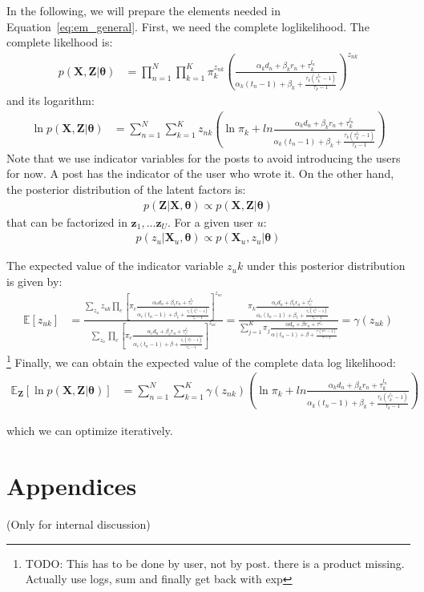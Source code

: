 \documentclass[smallextended]{svjour3}          %
\begin{document}
In the following, we will prepare the elements needed in Equation~\ref{eq:em_general}. First, we need the complete loglikelihood. The complete likelhood is:
\begin{align}
p(\mathbf{X, Z} | \boldsymbol{\theta}) &= 
\prod_{n=1}^N \prod_{k=1}^K \pi_k^{z_{nk}}
\left(
\frac{\alpha_k d_n + \beta_k r_n + \tau_k^{l_n}}{\alpha_k(t_n-1)+\beta_k + \frac{\tau_k(\tau_k^{t_n}-1)}{\tau_k-1}}
\right)^{z_{nk}}
\end{align}
and its logarithm:
\begin{align}
\ln p(\mathbf{X, Z} | \boldsymbol{\theta}) &= 
\sum_{n=1}^N \sum_{k=1}^K z_{nk}
\left(\ln \pi_k + 
ln \frac{\alpha_k d_n + \beta_k r_n + \tau_k^{l_n}}{\alpha_k(t_n-1)+\beta_k + \frac{\tau_k(\tau_k^{t_n}-1)}{\tau_k-1}}\right)
\end{align}
Note that we use indicator variables for the posts to avoid introducing the users for now. A post has the indicator of the user who wrote it. On the other hand, the posterior distribution of the latent factors is:
\begin{align*}
p(\mathbf{Z} | \mathbf{X}, \boldsymbol{\theta}) 
\propto 
p(\mathbf{X,Z} | \boldsymbol{\theta})
\end{align*}
that can be factorized in $\mathbf{z}_1,...\mathbf{z}_U$. For a given user $u$:
\begin{align*}
p(z_u | \mathbf{X}_u, \boldsymbol{\theta}) 
\propto 
p(\mathbf{X}_u, z_u | \boldsymbol{\theta})
\end{align*}

The expected value of the indicator variable $z_uk$ under this posterior distribution is given by:
\begin{align}
\mathbb{E}[z_{uk}] 
&= 
\frac{\sum_{z_u} z_{uk} \prod_c\left[\pi_c \frac{\alpha_c d_n + \beta_c r_n + \tau_c^{l_n}}{\alpha_c(t_n-1)+\beta_c + \frac{\tau_c(\tau_c^{t_n}-1)}{\tau_c-1}} \right]^{z_{uc}}}
{\sum_{z_u} \prod_c\left[\pi_c \frac{\alpha_c d_n + \beta_c r_n + \tau_c^{l_n}}{\alpha_c(t_n-1)+\beta + \frac{\tau_c(\tau_c^{t_n}-1)}{\tau_c-1}} \right]^{z_{uc}}}
=
\frac{\pi_{k} \frac{\alpha_c d_n + \beta_c r_n + \tau_c^{l_n}}{\alpha_c(t_n-1)+\beta_c + \frac{\tau_c(\tau_c^{t_n}-1)}{\tau_c-1}}}
{
\sum_{j=1}^{K}\pi_{j} \frac{\alpha d_n + \beta r_n + \tau^{l_n}}{\alpha(t_n-1)+\beta + \frac{\tau(\tau^{t_n}-1)}{\tau-1}} 
}
= \gamma(z_{uk})
\end{align}
\footnote{TODO: This has to be done by user, not by post. there is a product missing. Actually use logs, sum and finally get back with exp}
Finally, we can obtain the expected value of the complete data log likelihood:
\begin{align}
\mathbb{E}_{\mathbf{Z}}[\ln p(\mathbf{X,Z} | \boldsymbol{\theta})] &=
\sum_{n=1}^N \sum_{k=1}^K \gamma(z_{nk})
\left(
\ln \pi_k + 
ln \frac{\alpha_k d_n + \beta_k r_n + \tau_k^{l_n}}{\alpha_k(t_n-1)+\beta_k + \frac{\tau_k(\tau_k^{t_n}-1)}{\tau_k-1}}
\right)
\end{align}

which we can optimize iteratively.
\newpage
\section*{Appendices}
(Only for internal discussion)

 

\end{document}
